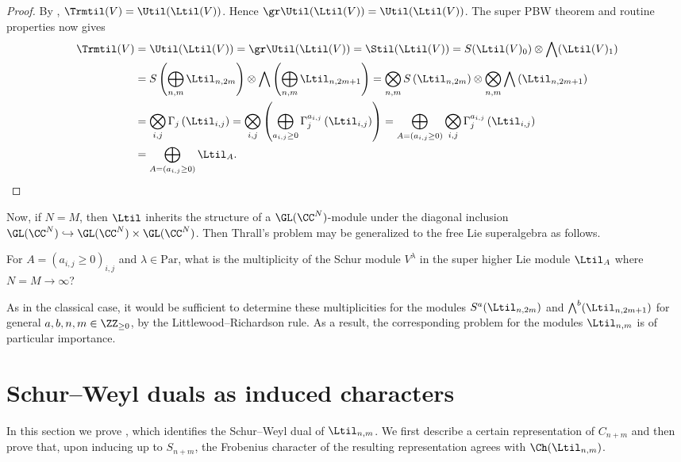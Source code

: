 \begin{proof}
    By , $\Trmtil(V) = \Util(\Ltil(V))$. Hence $\gr \Util(\Ltil(V)) = \Util(\Ltil(V))$. The super PBW theorem and routine properties now gives
    \begin{align*}
        \Trmtil(V)
          &= \Util(\Ltil(V)) = \gr \Util(\Ltil(V)) = \Stil(\Ltil(V)) = S(\Ltil(V)_0) \otimes \bigwedge(\Ltil(V)_1) \\
          &= S\left(\bigoplus_{n,m} \Ltil_{n, 2m}\right) \otimes \bigwedge\left(\bigoplus_{n,m} \Ltil_{n, 2m+1}\right)
           = \bigotimes_{n,m} S\left(\Ltil_{n, 2m}\right) \otimes \bigotimes_{n, m} \bigwedge\left(\Ltil_{n, 2m+1}\right) \\
          &= \bigotimes_{i, j} \Gamma_j\left(\Ltil_{i, j}\right)
           = \bigotimes_{i, j} \left( \bigoplus_{a_{i, j} \geq 0} \Gamma_j^{a_{i, j}}\left(\Ltil_{i, j}\right) \right)
           = \bigoplus_{A = (a_{i, j} \geq 0)} \bigotimes_{i, j} \Gamma_j^{a_{i, j}}\left(\Ltil_{i, j}\right) \\
          &= \bigoplus_{A = (a_{i, j} \geq 0)} \Ltil_A.\qedhere
    \end{align*}
\end{proof}

Now, if $N = M$, then $\Ltil$ inherits the structure of a $\GL(\CC^N)$-module under the diagonal inclusion $\GL(\CC^N) \hookrightarrow \GL(\CC^N) \times \GL(\CC^N)$. Then Thrall's problem may be generalized to the free Lie superalgebra as follows.
\begin{prob}
  For $A = (a_{i, j} \geq 0)_{i, j}$ and $\lambda \in \mathrm{Par}$, what is the multiplicity of the Schur module $V^\lambda$ in the super higher Lie module $\Ltil_A$ where $N=M \to \infty$?
\end{prob}
As in the classical case, it would be sufficient to determine these multiplicities for the modules $S^a(\Ltil_{n,2m})$ and $\bigwedge^b(\Ltil_{n,2m+1})$ for general $a,b,n,m \in \ZZ_{\ge 0}$, by the Littlewood--Richardson rule. As a result, the corresponding problem for the modules $\Ltil_{n,m}$ is of particular importance.

\section{Schur--Weyl duals as induced characters}\label{sec:super-induced}
In this section we prove , which identifies the Schur--Weyl dual of $\Ltil_{n,m}$. We first describe a certain representation of $C_{n+m}$ and then prove that, upon inducing up to $S_{n+m}$, the Frobenius character of the resulting representation agrees with $\Ch(\Ltil_{n,m})$.

